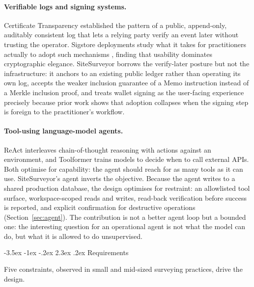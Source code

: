 \documentclass[10pt,a4paper,twocolumn]{article}
\makeatletter
\renewcommand\section{\@startsection{section}{1}{\z@}
  {-3.5ex \@plus -1ex \@minus -.2ex}
  {2.3ex \@plus.2ex}
  {\normalfont\Large\bfseries\hyphenpenalty=10000\exhyphenpenalty=10000}}
\makeatother
\begin{document}
\paragraph{Verifiable logs and signing systems.}
Certificate Transparency \cite{rfc6962} established the pattern of a public, append-only,
auditably consistent log that lets a relying party verify an event later without trusting
the operator. Sigstore deployments study what it takes for practitioners actually to adopt
such mechanisms \cite{sigstore2025}, finding that usability dominates cryptographic
elegance. SiteSurveyor borrows the verify-later posture but not the infrastructure: it
anchors to an existing public ledger rather than operating its own log, accepts the weaker
inclusion guarantee of a Memo instruction instead of a Merkle inclusion proof, and treats
wallet signing as the user-facing experience precisely because prior work shows that
adoption collapses when the signing step is foreign to the practitioner's workflow.

\paragraph{Tool-using language-model agents.}
ReAct \cite{react2022} interleaves chain-of-thought reasoning with actions against an
environment, and Toolformer \cite{toolformer2023} trains models to decide when to call
external APIs. Both optimise for capability: the agent should reach for as many tools as
it can use. SiteSurveyor's agent inverts the objective. Because the agent writes to a
shared production database, the design optimises for restraint: an allowlisted tool
surface, workspace-scoped reads and writes, read-back verification before success is
reported, and explicit confirmation for destructive operations
(Section~\ref{sec:agent}). The contribution is not a better agent loop but a bounded one:
the interesting question for an operational agent is not what the model can do, but what
it is allowed to do unsupervised.

\section{Requirements}
\label{sec:req}

Five constraints, observed in small and mid-sized surveying practices, drive the design.
\end{document}
